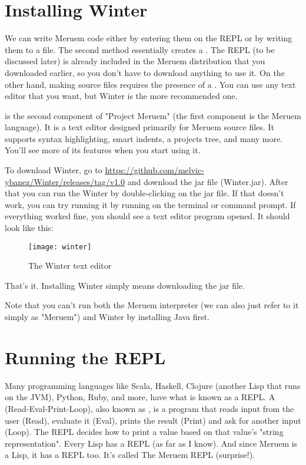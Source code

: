 \section{Installing Winter}
We can write Meruem code either by entering them on the REPL or by writing them to a file. The second method essentially creates a . The REPL (to be discussed later) is already included in the Meruem distribution that you downloaded earlier, so you don't have to download anything to use it. On the other hand, making source files requires the presence of a . You can use any text editor that you want, but Winter is the more recommended one. 

 is the second component of "Project Meruem" (the first component is the Meruem language). It is a text editor designed primarily for Meruem source files. It supports syntax highlighting, smart indents, a projects tree, and many more. You'll see more of its features when you start using it.

To download Winter, go to \url{https://github.com/melvic-ybanez/Winter/releases/tag/v1.0} and download the jar file (Winter.jar). After that you can run the Winter by double-clicking on the jar file. If that doesn't work, you can try running it by running  on the terminal or command prompt. If everything worked fine, you should see a text editor program opened. It should look like this:

\begin{figure}[H]
\texttt{[image: winter]}
\caption{The Winter text editor}
\centering
\end{figure}

That's it. Installing Winter simply means downloading the jar file.

Note that you can't run both the Meruem interpreter (we can also just refer to it simply as "Meruem") and Winter by installing Java first.

\section{Running the REPL}
Many programming languages like Scala, Haskell, Clojure (another Lisp that runs on the JVM), Python, Ruby, and more, have what is known as a REPL. A  (Read-Eval-Print-Loop), also known as , is a program that reads input from the user (Read), evaluate it (Eval), prints the result (Print) and ask for another input (Loop). The REPL decides how to print a value based on that value's "string representation". Every Lisp has a REPL (as far as I know). And since Meruem is a Lisp, it has a REPL too. It's called The Meruem REPL (surprise!). 

